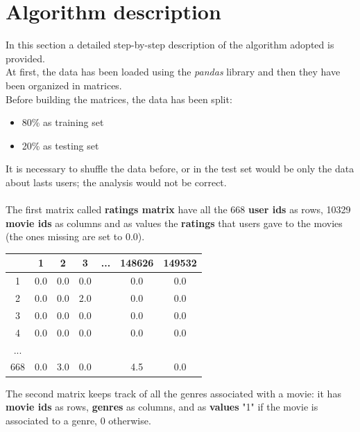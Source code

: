 \documentclass{article}
\begin{document}
\newpage

\section{Algorithm description}
In this section a detailed step-by-step description of the algorithm adopted is provided.\\
At first, the data has been loaded using the \textsl{pandas} library and then they have been organized in matrices.\\
Before building the matrices, the data has been split:
\begin{itemize}
      \item 80\% as training set
      \item 20\% as testing set
\end{itemize}
It is necessary to shuffle the data before, or in the test set would be only the data about lasts users; the analysis would not be correct.\\ \\
The first matrix called \textbf{ratings matrix} have all the 668 \textbf{user ids} as rows, 10329 \textbf{movie ids} as columns and as values the \textbf{ratings} that users gave to the movies (the ones missing are set to 0.0).\\
\begin{center}
      \begin{tabular}{ | c | c | c | c | c | c | c |} 
        \hline
        \rowcolor{lightgray}  & 1 & 2 & 3 & ... & 148626 & 149532 \\ 
        \hline
         \cellcolor{lightgray}1 & 0.0 & 0.0 & 0.0 &  & 0.0 & 0.0 \\ 
        \hline
        \cellcolor{lightgray}2 & 0.0 & 0.0 & 2.0 &  & 0.0 & 0.0 \\ 
        \hline
        \cellcolor{lightgray}3 & 0.0 & 0.0 & 0.0 &  & 0.0 & 0.0\\
        \hline
        \cellcolor{lightgray}4 & 0.0 & 0.0 & 0.0 &  & 0.0 & 0.0\\
        \hline
        \cellcolor{lightgray}... &  &  &  &  &  & \\ 
        \hline
        \cellcolor{lightgray}668 & 0.0 & 3.0 & 0.0 &  & 4.5 & 0.0\\
        \hline
      \end{tabular}
\end{center}

The second matrix keeps track of all the genres associated with a movie: it has \textbf{movie ids} as rows, \textbf{genres} as columns, and as \textbf{values} "1" if the movie is associated to a genre, 0 otherwise. \\
\end{document}
